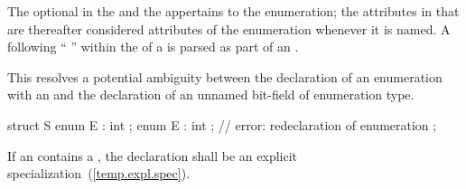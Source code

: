 The optional  in the  and
the  appertains to the enumeration; the attributes
in that  are thereafter considered attributes of the
enumeration whenever it is named.
A \tcode{:} following
``  ''
within the  of a 
is parsed as part of an .
\begin{note} This resolves a potential ambiguity between the declaration of an enumeration
with an  and the declaration of an unnamed bit-field of enumeration
type. \begin{example}

\begin{codeblock}
   struct S {
     enum E : int {};
     enum E : int {};  // error: redeclaration of enumeration
   };
\end{codeblock}

\end{example}
\end{note}
If an  contains
a ,
the declaration shall be an explicit specialization~(\ref{temp.expl.spec}).

